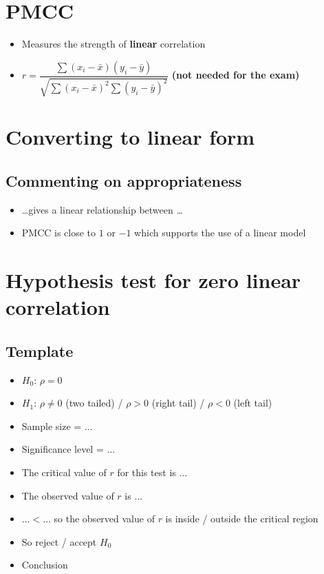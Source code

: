 
\section{PMCC}
\begin{itemize}
	\item Measures the strength of \textbf{linear} correlation
	\item $r =\dfrac{\sum\left(x_{i}-\bar{x}\right)\left(y_{i}-\bar{y}\right)}{\sqrt{\sum\left(x_{i}-\bar{x}\right)^{2} \sum\left(y_{i}-\bar{y}\right)^{2}}}$ \textbf{(not needed for the exam)}
\end{itemize}

\section{Converting to linear form}
\subsection{Commenting on appropriateness}
\begin{itemize}
	\item \dots gives a linear relationship between \dots
	\item PMCC is close to $1$ or $-1$ which supports the use of a linear model
\end{itemize}

\section{Hypothesis test for zero linear correlation}
\subsection{Template}
\begin{itemize}
	\item $H_0$: $\rho = 0$
	\item $H_1$: $\rho \neq 0$ (two tailed) / $\rho > 0$ (right tail) / $\rho < 0$ (left tail)
	\item Sample size = $\dots$
	\item Significance level = $\dots$
	\item The critical value of $r$ for this test is $\dots$
	\item The observed value of $r$ is $\dots$
	\item $\dots < \dots$ so the observed value of $r$ is inside / outside the critical region
	\item So reject / accept $H_0$
	\item Conclusion
\end{itemize}




